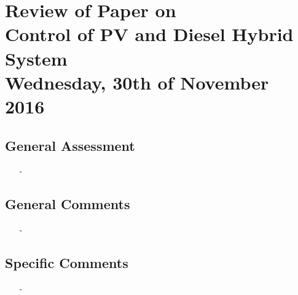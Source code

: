 
\renewcommand{\vec}[1]{\boldsymbol{\mathbf{#1}}}

\renewcommand\chaptername{KAPITEL}
\renewcommand\contentsname{Indhold}
\renewcommand\figurename{Figur}
\renewcommand\tablename{Tabel}

\section*{Review of Paper on\\
Control of PV and Diesel Hybrid System\\
\small Wednesday, 30th of November 2016}
\subsection{General Assessment}
\begin{itemize}
	\item[-]
\end{itemize}
\subsection{General Comments}
\begin{itemize}
	\item[-] 
\end{itemize}	
\subsection{Specific Comments}
\begin{itemize}
	\item[-]
\end{itemize}

